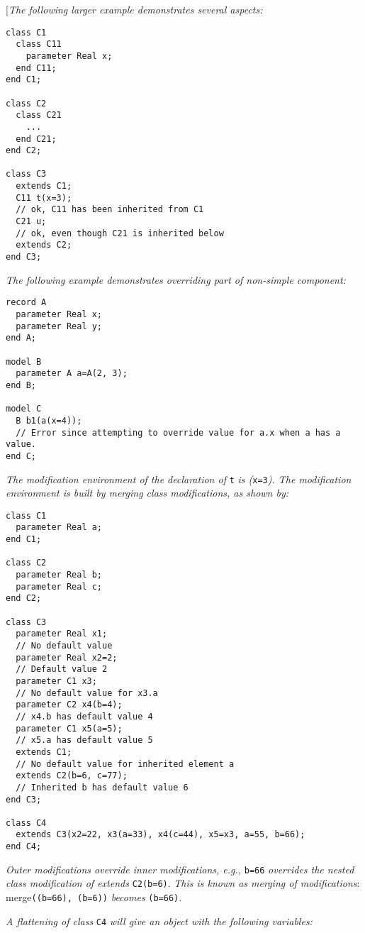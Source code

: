 {[}\emph{The following larger example demonstrates several aspects:}
\begin{lstlisting}[language=modelica]
class C1
  class C11
    parameter Real x;
  end C11;
end C1;

class C2
  class C21
    ...
  end C21;
end C2;

class C3
  extends C1;
  C11 t(x=3);
  // ok, C11 has been inherited from C1
  C21 u;
  // ok, even though C21 is inherited below
  extends C2;
end C3;
\end{lstlisting}
\emph{The following example demonstrates overriding part of non-simple
component: }
\begin{lstlisting}[language=modelica]
record A
  parameter Real x;
  parameter Real y;
end A;

model B
  parameter A a=A(2, 3);
end B;

model C
  B b1(a(x=4));
  // Error since attempting to override value for a.x when a has a value.
end C;
\end{lstlisting}

\emph{The modification environment of the declaration of} \lstinline[basicstyle=\ttfamily]!t! \emph{is
(}\lstinline[basicstyle=\ttfamily]!x=3!\emph{). The modification environment is built by merging class
modifications, as shown by: }
\begin{lstlisting}[language=modelica]
class C1
  parameter Real a;
end C1;

class C2
  parameter Real b;
  parameter Real c;
end C2;

class C3
  parameter Real x1;
  // No default value
  parameter Real x2=2;
  // Default value 2
  parameter C1 x3;
  // No default value for x3.a
  parameter C2 x4(b=4);
  // x4.b has default value 4
  parameter C1 x5(a=5);
  // x5.a has default value 5
  extends C1;
  // No default value for inherited element a
  extends C2(b=6, c=77);
  // Inherited b has default value 6
end C3;

class C4
  extends C3(x2=22, x3(a=33), x4(c=44), x5=x3, a=55, b=66);
end C4;
\end{lstlisting}

\emph{Outer modifications override inner modifications, e.g.,} \lstinline[basicstyle=\ttfamily]!b=66!
\emph{overrides the nested class modification of extends} \lstinline[basicstyle=\ttfamily]!C2(b=6)!.
\emph{This is known as merging of modifications}: merge\lstinline[basicstyle=\ttfamily]!((b=66), (b=6))!
\emph{becomes} \lstinline[basicstyle=\ttfamily]!(b=66)!.

\emph{A flattening of class} \lstinline[basicstyle=\ttfamily]!C4! \emph{will give an object with the
following variables: }


